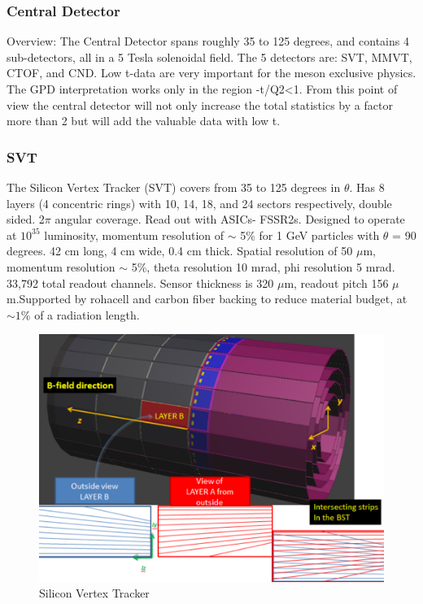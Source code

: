     \subsubsection{Central Detector}
        Overview: The Central Detector spans roughly 35 to 125 degrees, and contains 4 sub-detectors, all in a 5 Tesla solenoidal field. The 5 detectors are: SVT, MMVT, CTOF, and CND. 
        Low t-data are very important for the meson exclusive physics. The GPD interpretation works only in the region -t/Q2<1. From this point of view the central detector will not only increase the total statistics by a factor more than 2 but will add the valuable data with low t.


        \subsubsection{SVT}
            The Silicon Vertex Tracker (SVT) covers from 35 to 125 degrees in $\theta$. Has 8 layers (4 concentric rings) with 10, 14, 18, and 24 sectors respectively, double sided. 2$\pi$ angular coverage. Read out with ASICs- FSSR2s. Designed to operate at $10^{35}$ luminosity, momentum resolution of $\sim$ 5\% for 1 GeV particles with $\theta$ = 90 degrees. 42 cm long, 4 cm wide, 0.4 cm thick. Spatial resolution of 50 $\mu$m, momentum resolution $\sim$ 5\%, theta resolution 10 mrad, phi resolution 5 mrad.  33,792 total readout channels. Sensor thickness is 320 $\mu$m, readout pitch 156 $\mu$ m.Supported by rohacell and carbon fiber backing to reduce material budget, at $\sim 1\%$ of a radiation length.
            
            \begin{figure}[H]
    			\centering
    			\includegraphics[width=12cm]{Chapters/Ch2-Experiment/clas-12-system/pics/cd/svt.PNG}
    			\caption{Silicon Vertex Tracker}
			\end{figure}  
			
